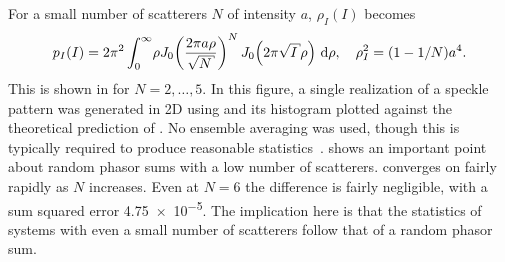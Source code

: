 For a small number of scatterers $N$ of intensity $a$, $\rho_I(I)$
becomes~\cite{goodman2007speckle}
\begin{equation}
p_I(I) = 2\pi^2 \int_0^\infty\! \rho J_0\!\left(\frac{2\pi a
\rho}{\sqrt{N}}\right)^N J_0\!\left(2\pi\sqrt{I}\rho\right)\md\rho,\quad \rho_I^2=(1-1/N)a^4.
\label{eqn:smallscatteqn}
\end{equation}
This is shown in  for
$N=2,\ldots,5$.  In this figure, a single realization of a speckle pattern was generated in 2D
using  and its histogram plotted against the
theoretical prediction of .  No ensemble
averaging was used, though this is typically required to produce reasonable 
statistics~\cite{goodman2007speckle}.
 shows an important point about random phasor sums
with a low number of scatterers.   converges on
 fairly rapidly as $N$ increases.  Even at $N=6$ the
difference is fairly negligible, with a sum squared error \num{4.75e-5}.
The implication here is that the statistics of systems with even a small
number of scatterers follow that of a random phasor sum.
